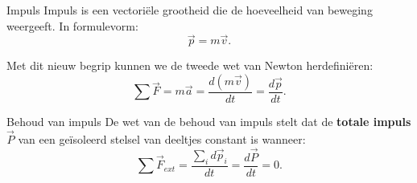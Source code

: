 \begin{theo}[Impuls]{Impuls}
    Impuls is een vectoriële grootheid die de hoeveelheid van beweging weergeeft. In formulevorm: 
        \begin{equation*}
            \Vec{p} = m\Vec{v}.
        \end{equation*}
        
    \noindent Met dit nieuw begrip kunnen we de tweede wet van Newton herdefiniëren:
    \begin{equation*}
        \sum \Vec{F} = m\Vec{a} = \dfrac{d(m\Vec{v})}{dt} = \dfrac{d\Vec{p}}{dt}.
    \end{equation*}

    \vspace{-0.3cm}

\end{theo}

\begin{lem}{Behoud van impuls}
    De wet van de behoud van impuls stelt dat de \textbf{totale impuls} $ \Vec{P} $ van een geïsoleerd stelsel van deeltjes constant is wanneer: 
    \begin{equation*}
         \sum \Vec{F}_{ext} = \dfrac{\sum_i d\Vec{p}_i}{dt} = \dfrac{d\Vec{P}}{dt} = 0.
    \end{equation*} 
\end{lem}

